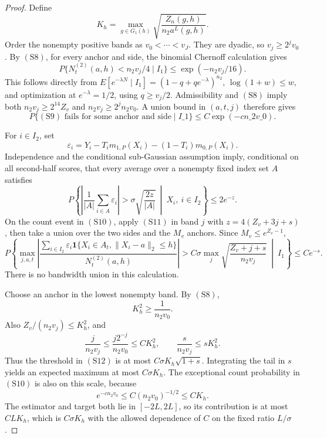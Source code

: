 \documentclass{article}
\begin{document}
\begin{proof}
Define
\[
 K_h=\max_{g\in G_1(h)}
 \sqrt{\frac{Z_n(g,h)}{n_2a^L(g,h)}}.
\]
Order the nonempty positive bands as \(v_0<\cdots<v_J\).
They are dyadic, so \(v_j\geq2^jv_0\).  By \((\mathrm{S8})\), for every
anchor and side, the binomial Chernoff calculation gives
\[
 P\{N^{(2)}_t(a,h)<n_2v_j/4\mid I_1\}
 \leq\exp(-n_2v_j/16).                                           \tag{S9}
\]
This follows directly from
\(E[e^{-\lambda N}\mid I_1]=(1-q+qe^{-\lambda})^{n_2}\),
\(\log(1+w)\leq w\), and optimization at
\(e^{-\lambda}=1/2\), using \(q\geq v_j/2\).
Admissibility and \((\mathrm{S8})\) imply both
\(n_2v_j\geq2^{14}Z_v\) and
\(n_2v_j\geq2^jn_2v_0\).  A union bound in \((a,t,j)\) therefore gives
\[
 P\{\text{\((\mathrm{S9})\) fails for some anchor and side}\mid I\_1\}
 \leq C\exp(-c n\_2v\_0).                                         \tag{S10}
\]

For \(i\in I_2\), set
\[
 \varepsilon_i
 =Y_i-T_im_{1,P}(X_i)-(1-T_i)m_{0,P}(X_i).
\]
Independence and the conditional sub-Gaussian assumption imply, conditional
on all second-half scores, that every average over a nonempty fixed index
set \(A\) satisfies
\[
 P\!\left\{\left|\frac1{|A|}\sum_{i\in A}\varepsilon_i\right|
 >\sigma\sqrt{\frac{2z}{|A|}}\ \middle|\ X_i,\ i\in I_2\right\}
 \leq2e^{-z}.                                                     \tag{S11}
\]
On the count event in \((\mathrm{S10})\), apply \((\mathrm{S11})\) in band
\(j\) with \(z=4(Z_v+3j+s)\), then take a union over the two sides and the
\(M_v\) anchors.  Since \(M_v\leq e^{Z_v-1}\),
\[
 P\!\left\{
 \max_{j,a,t}\left|
 \frac{\sum_{i\in I_2}\varepsilon_i
 \mathbf1\{X_i\in A_t,\|X_i-a\|_2\leq h\}}
 {N^{(2)}_t(a,h)}
 \right|
 >C\sigma\max_j
 \sqrt{\frac{Z_v+j+s}{n_2v_j}}
 \ \middle|\ I_1\right\}
 \leq Ce^{-s}.                                                     \tag{S12}
\]
There is no bandwidth union in this calculation.

Choose an anchor in the lowest nonempty band.  By \((\mathrm{S8})\),
\[
 K_h^2\geq\frac1{n_2v_0}.
\]
Also \(Z_v/(n_2v_j)\leq K_h^2\), and
\[
 \frac{j}{n_2v_j}\leq
 \frac{j2^{-j}}{n_2v_0}\leq CK_h^2,
 \qquad
 \frac{s}{n_2v_j}\leq sK_h^2.                                   \tag{S13}
\]
Thus the threshold in \((\mathrm{S12})\) is at most
\(C\sigma K_h\sqrt{1+s}\).  Integrating the tail in \(s\) yields an expected
maximum at most \(C\sigma K_h\).  The exceptional count probability in
\((\mathrm{S10})\) is also on this scale, because
\[
 e^{-c n_2v_0}\leq C(n_2v_0)^{-1/2}\leq CK_h.                    \tag{S14}
\]
The estimator and target both lie in \([-2L,2L]\), so its contribution is
at most \(C L K_h\), which is \(C\sigma K_h\) with the allowed dependence
of \(C\) on the fixed ratio \(L/\sigma\).


\end{proof}
\end{document}
